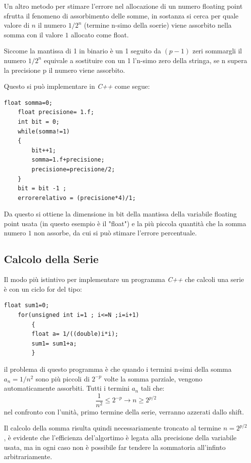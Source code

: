 \documentclass{article}
\begin{document}
Un altro metodo per stimare l'errore nel allocazione di un numero floating point sfrutta il fenomeno di assorbimento delle somme, in sostanza si cerca per quale valore di $n$ il numero $1/2^{n}$ (termine n-simo della soerie) viene assorbito nella somma con il valore $1$ allocato come float.

Siccome la mantissa di 1 in binario è un 1 seguito da $(p-1)$ zeri sommargli il numero $1/2^{n}$ equivale a sostituire con un 1 l'n-simo zero della stringa, se n supera la precisione p il numero viene assorbito.

Questo si può implementare in \emph{C++} come segue:
\begin{lstlisting}[frame=single]
	float somma=0;
	float precisione= 1.f;
	int bit = 0;  
	while(somma!=1)
    {
		bit++1;
		somma=1.f+precisione;
		precisione=precisione/2;
    }
	bit = bit -1 ;
	errorerelativo = (precisione*4)/1;
\end{lstlisting}

Da questo si ottiene la dimensione in bit della mantissa della variabile floating point usata (in questo esempio è il "float") e la più piccola quantità che la somma numero $1$ non assorbe, da cui si può stimare l'errore percentuale.

\subsection{Calcolo della Serie}

Il modo più istintivo per implementare un programma \emph{C++} che calcoli una serie è con un ciclo for del tipo:

\begin{lstlisting}[frame=single]
float sum1=0;
	for(unsigned int i=1 ; i<=N ;i=i+1)
		{
		float a= 1/((double)i*i);
		sum1= sum1+a;
		}
\end{lstlisting}

il problema di questo programma è che quando i termini n-simi della somma $a_{n} = 1/n^{2}$ sono più piccoli di $2^{-p}$ volte la somma parziale, vengono automaticamente assorbiti.
Tutti i termini $a_{n}$ tali che:
\begin{displaymath}
\frac{1}{n^{2}}\leq 2^{-p}\rightarrow n\geq 2^{p/2}
\end{displaymath}
nel confronto con l'unità, primo termine della serie, verranno azzerati dallo shift.

Il calcolo della somma risulta quindi necessariamente troncato al termine $ n = 2^{p/2} $, è evidente che l'efficienza del'algortimo è legata alla precisione della variabile usata, ma in ogni caso non è possibile far tendere la sommatoria all'infinto arbitrariamente.
\end{document}
